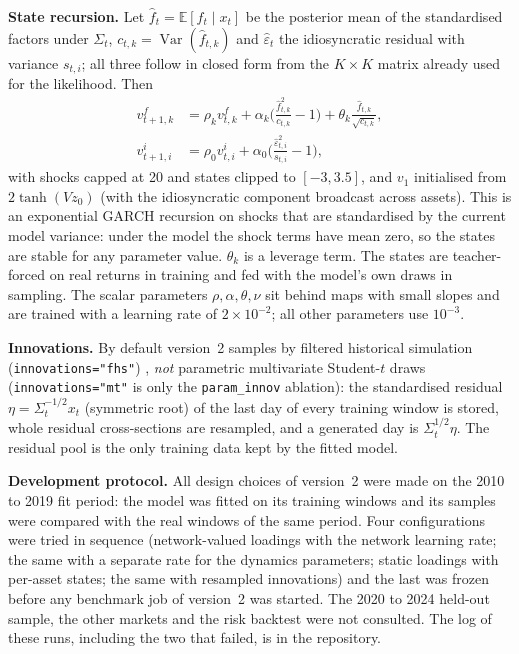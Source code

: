 \documentclass[journal]{IEEEtran}
\begin{document}
\textbf{State recursion.} Let $\hat f_t=\mathbb{E}[f_t\mid x_t]$ be the posterior mean of the standardised
factors under $\Sigma_t$, $c_{t,k}=\operatorname{Var}(\hat f_{t,k})$ and $\hat\varepsilon_t$ the
idiosyncratic residual with variance $s_{t,i}$; all three follow in closed form from the $K\times K$ matrix
already used for the likelihood. Then
\begin{align}
v^{f}_{t+1,k} &= \rho_k v^{f}_{t,k} + \alpha_k\Big(\frac{\hat f_{t,k}^2}{c_{t,k}}-1\Big)
                + \theta_k\frac{\hat f_{t,k}}{\sqrt{c_{t,k}}}, \label{eq:vf}\\
v^{i}_{t+1,i} &= \rho_0 v^{i}_{t,i} + \alpha_0\Big(\frac{\hat\varepsilon_{t,i}^2}{s_{t,i}}-1\Big), \label{eq:vi}
\end{align}
with shocks capped at 20 and states clipped to $[-3,3.5]$, and $v_1$ initialised from $2\tanh(Vz_0)$ (with the
idiosyncratic component broadcast across assets). This is an exponential GARCH recursion
\cite{nelson1991egarch} on shocks that are standardised by the current model variance: under the model the
shock terms have mean zero, so the states are stable for any parameter value. $\theta_k$ is a leverage term.
The states are teacher-forced on real returns in training and fed with the model's own draws in sampling. The
scalar parameters $\rho,\alpha,\theta,\nu$ sit behind maps with small slopes and are trained with a learning
rate of $2\times10^{-2}$; all other parameters use $10^{-3}$.

\textbf{Innovations.} By default version~2 samples by filtered historical simulation (\texttt{innovations="fhs"})
\cite{baroneadesi1999fhs}, \emph{not} parametric multivariate Student-$t$ draws (\texttt{innovations="mt"} is
only the \texttt{param\_innov} ablation): the standardised residual
$\eta=\Sigma_t^{-1/2}x_t$ (symmetric root) of the last day of every training window is stored, whole residual
cross-sections are resampled, and a generated day is $\Sigma_t^{1/2}\eta$. The residual pool is the only
training data kept by the fitted model.

\textbf{Development protocol.} All design choices of version~2 were made on the 2010 to 2019 fit period: the
model was fitted on its training windows and its samples were compared with the real windows of the same
period. Four configurations were tried in sequence (network-valued loadings with the network learning rate;
the same with a separate rate for the dynamics parameters; static loadings with per-asset states; the same
with resampled innovations) and the last was frozen before any benchmark job of version~2 was started. The
2020 to 2024 held-out sample, the other markets and the risk backtest were not consulted. The log of these
runs, including the two that failed, is in the repository.
\end{document}
